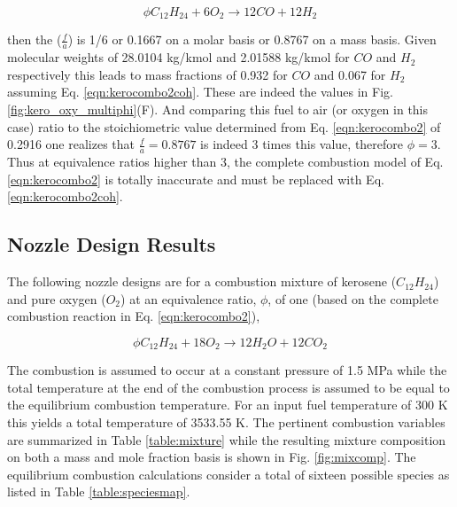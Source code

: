 \begin{equation}
	\phi C_{12}H_{24} + 6 O_2 \longrightarrow 12 CO + 12 H_2
\label{eqn:kerocombo2coh}
\end{equation}	

	then the ($\frac{f}{a}$) is 1/6 or 0.1667 on a molar basis or 0.8767 on a mass basis.  
Given molecular weights of 28.0104 kg/kmol and 2.01588 kg/kmol for $CO$ and $H_2$ respectively this leads 
to mass fractions of 0.932 for $CO$ and 0.067 for $H_2$ assuming Eq. \ref{eqn:kerocombo2coh}.  These
are indeed the values in Fig. \ref{fig:kero_oxy_multiphi}(F).  And comparing this fuel to air (or 
oxygen in this case) ratio to the stoichiometric value determined from Eq. \ref{eqn:kerocombo2} of 0.2916 
one realizes that $\frac{f}{a} = 0.8767$ is indeed 3 times this value, therefore $\phi = 3$.  
Thus at equivalence ratios higher than 3, the complete combustion model of Eq. \ref{eqn:kerocombo2} is
totally inaccurate and must be replaced with Eq. \ref{eqn:kerocombo2coh}.
\subsection{Nozzle Design Results}

	The following nozzle designs are for a combustion mixture of kerosene
($C_{12}H_{24}$) and pure oxygen ($O_2$) at an equivalence ratio, $\phi$, of one (based on the 
complete combustion reaction in Eq. \ref{eqn:kerocombo2}),

\begin{displaymath}
	\phi C_{12}H_{24} + 18 O_2 \longrightarrow 12 H_2O + 12 CO_2
\label{eqn:kerocombo2b}
\end{displaymath}

	The combustion is assumed to occur at a constant pressure of 1.5 MPa while the total 
temperature at the end of the combustion process is assumed to be equal to the equilibrium 
combustion temperature.  For an input fuel temperature of 300 K this yields a total temperature 
of  3533.55 K.  The pertinent combustion variables are summarized in Table \ref{table:mixture} while
the resulting mixture composition on both a mass and mole fraction basis is shown in
Fig. \ref{fig:mixcomp}.  The equilibrium combustion calculations consider a total of sixteen
possible species as listed in Table \ref{table:speciesmap}.

